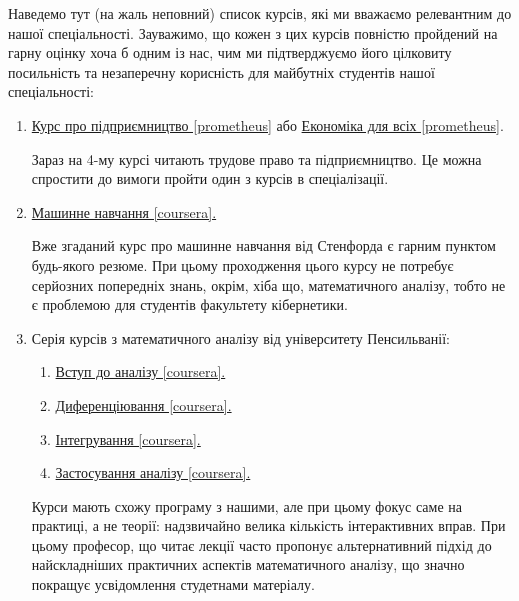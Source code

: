 \documentclass[14pt, a4paper]{extarticle}  %
\begin{document}
Наведемо тут (на жаль неповний) список курсів, які ми вважаємо релевантним до нашої спеціальності. Зауважимо, що кожен з цих курсів повністю пройдений на гарну оцінку хоча б одним із нас, чим ми підтверджуємо його цілковиту посильність та незаперечну корисність для майбутніх студентів нашої спеціальності:
\begin{enumerate}
    \item \href{https://prometheus.org.ua/entrepreneurship/}{Курс про підприємництво [prometheus]} або \href{https://edx.prometheus.org.ua/courses/NaUKMA/103/2015_T1/about}{Економіка для всіх [prometheus]}.
    
    Зараз на 4-му курсі читають трудове право та підприємництво. Це можна спростити до вимоги пройти один з курсів в спеціалізації.
    
    \item \href{https://www.coursera.org/learn/machine-learning}{Машинне навчання [coursera].}
    
    Вже згаданий курс про машинне навчання від Стенфорда є гарним пунктом будь-якого резюме. При цьому проходження цього курсу не потребує серйозних попередніх знань, окрім, хіба що, математичного аналізу, тобто не є проблемою для студентів факультету кібернетики.
    
    \item Серія курсів з математичного аналізу від університету Пенсильванії:
	\begin{enumerate}
		\item \href{https://www.coursera.org/learn/single-variable-calculus/home/welcome}{Вступ до аналізу [coursera].}
		\item \href{https://www.coursera.org/learn/differentiation-calculus/home/welcome}{Диференціювання [coursera].}
		\item \href{https://www.coursera.org/learn/integration-calculus/home/welcome}{Інтегрування [coursera].}
		\item \href{https://www.coursera.org/learn/applications-calculus/home/welcome}{Застосування аналізу [coursera].}
	\end{enumerate}
    
    Курси мають схожу програму з нашими, але при цьому фокус саме на практиці, а не теорії: надзвичайно велика кількість інтерактивних вправ. При цьому професор, що читає лекції часто пропонує альтернативний підхід до найскладніших практичних аспектів математичного аналізу, що значно покращує усвідомлення студетнами матеріалу.


\end{enumerate}
\end{document}
